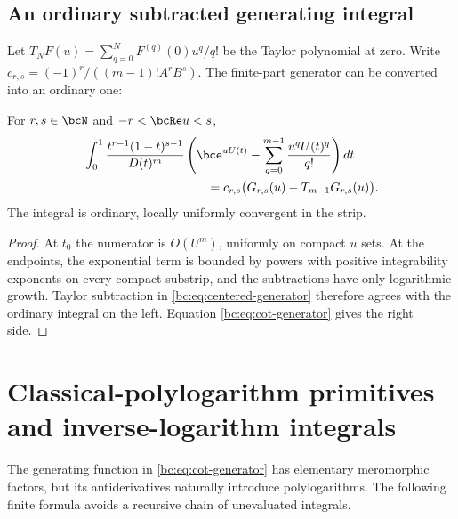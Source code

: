 \subsection{An ordinary subtracted generating integral}

Let $T_NF(u)=\sum_{q=0}^NF^{(q)}(0)u^q/q!$ be the Taylor polynomial
at zero. Write $c_{r,s}=(-1)^r/((m-1)!A^rB^s)$. The finite-part generator
can be converted into an ordinary one:
\begin{corollary}
\label{bc:cor:ordinary-generator}
For $r,s\in\bcN$ and $-r<\bcRe u<s$,
\begin{align}
 &\int_0^1\frac{t^{r-1}(1-t)^{s-1}}{D(t)^m}
     \left(\bce^{uU(t)}-\sum_{q=0}^{m-1}
                        \frac{u^qU(t)^q}{q!}\right)dt\notag\\
 &\hspace{35mm}=c_{r,s}\bigl(G_{r,s}(u)-T_{m-1}G_{r,s}(u)\bigr).
 \label{bc:eq:ordinary-generator}
\end{align}
The integral is ordinary, locally uniformly convergent in the strip.
\end{corollary}
\begin{proof}
At $t_0$ the numerator is $O(U^m)$, uniformly on compact $u$ sets.
At the endpoints, the exponential term is bounded by powers with
positive integrability exponents on every compact substrip, and the
subtractions have only logarithmic growth. Taylor subtraction in
\eqref{bc:eq:centered-generator} therefore agrees with the ordinary
integral on the left. Equation \eqref{bc:eq:cot-generator} gives the
right side.
\end{proof}

\section{Classical-polylogarithm primitives and inverse-logarithm integrals}
\label{bc:sec:polylog}

The generating function in \eqref{bc:eq:cot-generator} has elementary
meromorphic factors, but its antiderivatives naturally introduce
polylogarithms. The following finite formula avoids a recursive chain of
unevaluated integrals.

